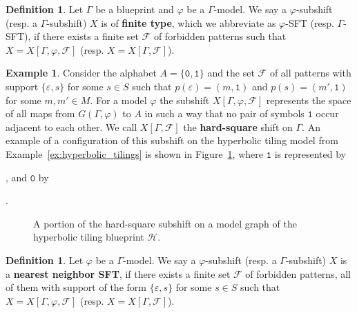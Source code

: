\documentclass{article}
\theoremstyle{definition}
\newtheorem{defn}[theorem]{Definition} %
\newtheorem{example}[theorem]{Example} %
\theoremstyle{definition}
\newcommand{\FF}{\mathcal{F}}
\newcommand{\symb}[1]{\texttt{#1}}
\newcommand{\define}[1]{\textbf{#1}}
\newcommand{\todo}[1]{\textcolor{red}{\textnormal{TODO: #1}}}
\begin{document}
\begin{defn}
    Let $\Gamma$ be a blueprint and $\varphi$ be a $\Gamma$-model. We say a $\varphi$-subshift (resp. a $\Gamma$-subshift) $X$ is of \define{finite type}, which we abbreviate as $\varphi$-SFT (resp. $\Gamma$-SFT), if there exists a finite set $\mathcal{F}$ of forbidden patterns such that $X = X[\Gamma,\varphi, \mathcal{F}]$ (resp. $X = X[\Gamma,\mathcal{F}]$). 
\end{defn}


\begin{example}
\label{ex:hardsquare}
    Consider the alphabet $A = \{ \symb{0},\symb{1}\}$ and the set $\mathcal{F}$ of all patterns with support $\{\varepsilon,s\}$ for some $s \in S$ such that $p(\varepsilon) = (m,\symb{1})$ and $p(s)=(m',\symb{1})$ for some $m,m'\in M$. For a model $\varphi$ the subshift $X[\Gamma,\varphi,\mathcal{F}]$ represents the space of all maps from $G(\Gamma,\varphi)$ to $A$ in such a way that no pair of symbols $\symb{1}$ occur adjacent to each other. We call $X[\Gamma,\FF]$ the \define{hard-square} shift on $\Gamma$. An example of a configuration of this subshift on the hyperbolic tiling model from Example~\ref{ex:hyperbolic_tilings} is shown in Figure~\ref{fig:hyper_square}, where $\symb{1}$ is represented by , and $\symb{0}$ by .
    \begin{figure}[H]
    \centering
    
    \caption{A portion of the hard-square subshift on a model graph of the hyperbolic tiling blueprint $\mathcal{H}$. }
    \label{fig:hyper_square}
\end{figure}
\end{example}

\begin{defn}
    Let $\varphi$ be a $\Gamma$-model. We say a $\varphi$-subshift (resp. a $\Gamma$-subshift) $X$ is a \define{nearest neighbor SFT}, if there exists a finite set $\mathcal{F}$ of forbidden patterns, all of them with support of the form $\{\varepsilon,s\}$ for some $s \in S$ such that $X = X[\Gamma,\varphi, \mathcal{F}]$ (resp. $X = X[\Gamma,\mathcal{F}]$).
\end{defn}
\end{document}
